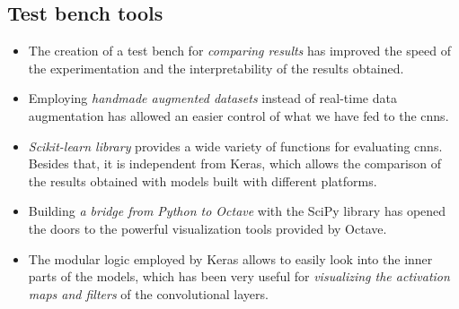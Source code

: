 \subsection*{Test bench tools}
\begin{itemize}
	\item The creation of a test bench for \emph{comparing results} has improved the speed of the experimentation and the interpretability of the results obtained.
	\item Employing \emph{handmade augmented datasets} instead of real-time data augmentation has allowed an easier control of what we have fed to the \glspl{cnn}.
	\item \emph{Scikit-learn library} provides a wide variety of functions for evaluating \glspl{cnn}. Besides that, it is independent from Keras, which allows the comparison of the results obtained with models built with different platforms. 
	\item Building \emph{a bridge from Python to Octave} with the SciPy library has opened the doors to the powerful visualization tools provided by Octave.
	\item The modular logic employed by Keras allows to easily look into the inner parts of the models, which has been very useful for \emph{visualizing the activation maps and filters} of the convolutional layers.
\end{itemize}

